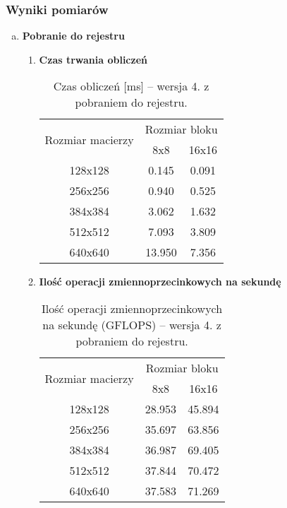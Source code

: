 \subsubsection{Wyniki pomiarów}

\begin{enumerate}[(a)]

\item \textbf{Pobranie do rejestru} \newline

\begin{enumerate}[1.]

\item \textbf{Czas trwania obliczeń} \newline

\begin{table}[H]
\centering
\begin{tabular}{|c|c|c|}
\hline
\multirow{2}{*}{Rozmiar macierzy} & \multicolumn{2}{c|}{Rozmiar bloku} \\ \cline{2-3}
& 8x8 & 16x16 \\ \hline
128x128 & 0.145 & 0.091 \\ \hline
256x256 & 0.940 & 0.525 \\ \hline
384x384 & 3.062 & 1.632 \\ \hline
512x512 & 7.093 & 3.809 \\ \hline
640x640 & 13.950 & 7.356 \\ \hline
\end{tabular}
\caption{Czas obliczeń [ms] -- wersja 4. z pobraniem do rejestru.}
\end{table}

\item \textbf{Ilość operacji zmiennoprzecinkowych na sekundę} \newline

\begin{table}[H]
\centering
\begin{tabular}{|c|c|c|}
\hline
\multirow{2}{*}{Rozmiar macierzy} & \multicolumn{2}{c|}{Rozmiar bloku} \\ \cline{2-3}
& 8x8 & 16x16 \\ \hline
128x128 & 28.953 & 45.894 \\ \hline
256x256 & 35.697 & 63.856 \\ \hline
384x384 & 36.987 & 69.405 \\ \hline
512x512 & 37.844 & 70.472 \\ \hline
640x640 & 37.583 & 71.269 \\ \hline
\end{tabular}
\caption{Ilość operacji zmiennoprzecinkowych na sekundę (GFLOPS) -- wersja 4. z pobraniem do rejestru.}
\end{table}


\end{enumerate}
\end{enumerate}
